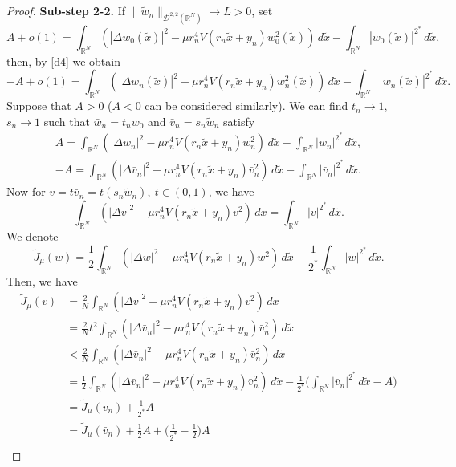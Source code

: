 \documentclass[reqno]{amsart}
\begin{document}
\begin{proof}
\noindent\textbf{Sub-step 2-2.}
 If \(\|\tilde{w}_n\|_{ \mathcal{D}^{2,2}(\mathbb{R}^N)}\to L>0\), set
 \[
 A+o(1)=\int_{\mathbb{R}^N}\left( |\Delta w_0(\tilde{x})|^2
 -\mu r_n^4V(r_n\tilde{x}+y_n)w_0^2(\tilde{x})\right) \, d\tilde{x}-\int _{\mathbb{R}^N}|w_0(\tilde{x})|^{2^*}\,d\tilde{x},
 \]
 then, by \eqref{d4} we obtain
\[
 -A+o(1)=\int_{\mathbb{R}^N}\left( |\Delta w_n(\tilde{x})|^2-\mu r_n^4V(r_n\tilde{x}+y_n)w_n^2(\tilde{x})\right) \, d\tilde{x}-\int _{\mathbb{R}^N}|w_n(\tilde{x})|^{2^*}\,d\tilde{x}.
\]
Suppose that \(A>0\) ($A<0$ can be considered similarly). We can find 
\(t_n\to 1, \) \(s_n\to 1\) such that
\( \bar {w}_n=t_n w_0\) and \(\bar {v}_n=s_n \tilde{w}_n\)
satisfy
 \begin{gather}\label{e1}
 A=\int_{\mathbb{R}^N}\left(|\Delta \bar {w}_n|^2-\mu r_n^4V(r_n\tilde{x}+y_n)
 \bar {w}_n^2\right) \,d\tilde{x}-\int _{\mathbb{R}^N}| \bar {w}_n|^{2^*}\,d\tilde{x},\\
\label{e2}
 -A= \int_{\mathbb{R}^N}\left(|\Delta \bar {v}_n|^2
 -\mu r_n^4V(r_n\tilde{x}+y_n)\bar {v}_n^2\right)\,d\tilde{x} 
 -\int _{\mathbb{R}^N}| \bar {v}_n|^{2^*}\,d\tilde{x}.
 \end{gather}
Now for \(v=t\bar{v}_n=t(s_n\tilde{w}_n), \ t\in (0,1)\), we have
 \[
 \int_{\mathbb{R}^N}\left(|\Delta v|^2-\mu r_n^4V(r_n\tilde{x}+y_n)v^2\right)\,d\tilde{x}=\int _{\mathbb{R}^N}|v|^{2^*}\,d\tilde{x}.
 \]
We denote
\[
 \tilde{J}_\mu(w)=\frac{1}{2}\int_{\mathbb{R}^N}\left(|\Delta w|^2-\mu r_n^4V(r_n\tilde{x}+y_n)w^2\right)\,d\tilde{x}-\frac{1}{2^*}\int _{\mathbb{R}^N}|w|^{2^*}\,d\tilde{x}.
\]
Then, we have
 \begin{align*}
 \tilde{J}_\mu(v)
 &=\frac{2}{N}\int_{\mathbb{R}^N}\left(|\Delta v|^2
  -\mu r_n^4V(r_n\tilde{x}+y_n)v^2\right)\,d\tilde{x}\\
 &=\frac{2}{N}t^2\int_{\mathbb{R}^N}\left(|\Delta \bar {v}_n|^2
  -\mu r_n^4V(r_n\tilde{x}+y_n)\bar {v}_n^2\right)\,d\tilde{x}\\
 &<\frac{2}{N}\int_{\mathbb{R}^N}\left(|\Delta \bar {v}_n|^2
  -\mu r_n^4V(r_n\tilde{x}+y_n)\bar {v}_n^2\right)\,d\tilde{x}\\
 &=\frac{1}{2}\int_{\mathbb{R}^N}\left(|\Delta \bar {v}_n|^2
  -\mu r_n^4V(r_n\tilde{x}+y_n)\bar {v}_n^2\right)\,d\tilde{x}
  -\frac{1}{2^*}\Big(\int _{\mathbb{R}^N}| \bar {v}_n|^{2^*}\,d\tilde{x}-A\Big) \\
 &=\tilde{J}_\mu(\bar {v}_n)+\frac{1}{2^*}A\\
 &=\tilde{J}_\mu(\bar {v}_n)+\frac{1}{2}A
  +\Big( \frac{1}{2^*}-\frac{1}{2}\Big) A\\

\end{align*}
\end{proof}
\end{document}
